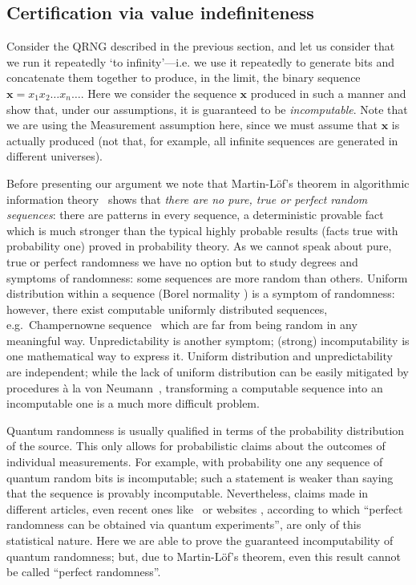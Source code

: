 \documentclass[%
 preprint,
 showpacs,
 showkeys,
 amsmath,
 amssymb,
 aps,
 pra,
 ]{revtex4-1}
\theoremstyle{definition}
\newcommand{\seq}[1]{\mathbf{#1}}
\begin{document}
\subsection{Certification via value indefiniteness}

Consider the QRNG
described in the previous section, and let us consider that we run it repeatedly `to infinity'---i.e. we use it repeatedly to generate bits and concatenate them together to produce, in the limit, the binary sequence $\seq{x}=x_1 x_2 \dots x_n \dots$.
Here we consider the sequence $\seq{x}$ produced in such a manner and show that, under our assumptions, it is guaranteed to be {\em incomputable}.
Note that we are using the Measurement assumption here, since we must assume that $\seq{x}$ is actually produced (not that, for example, all infinite sequences are generated in different universes).

Before presenting our argument we note that
Martin-L\"of's theorem in algorithmic information theory~\cite{calude:02}
shows that {\em there are no  pure, true or perfect random sequences}:
there are patterns in every sequence,
a deterministic provable fact which is much stronger than the typical
highly probable results (facts true with probability one) proved in probability theory.
As  we cannot speak about pure, true or perfect randomness
we have no option but to study degrees and symptoms of randomness:
some sequences are more random than others.
Uniform distribution within a sequence (Borel normality \cite{borel:09}) is a symptom of randomness:
however,  there exist
computable uniformly distributed sequences, e.g.\ Champernowne
 sequence~\cite{calude:02} which are far from being random in any meaningful way.
Unpredictability is another symptom;
(strong) incomputability is one mathematical way to express it.
Uniform distribution and unpredictability
are independent;
while the lack of uniform distribution can be easily mitigated by procedures
\`a la von Neumann~\cite{AbbottCalude10},
transforming a computable sequence  into an incomputable one is a much more difficult problem.

Quantum randomness is usually qualified in terms of the probability distribution of the source.
This only allows for probabilistic claims about the outcomes of individual measurements.
For example, with probability one any sequence of quantum random bits is incomputable; such a statement is
 weaker than saying that the sequence is  provably incomputable.
Nevertheless, claims made in different articles,
even recent ones like~\cite{10.1038/nature09008,Merali:2014aa}
or websites \cite{idQuantique,ANU}, according to which
``perfect randomness can be obtained via quantum experiments'',
are only of this statistical nature.
Here we are able to prove the guaranteed  incomputability of quantum randomness;
but, due to
Martin-L\"of's theorem, even this result cannot be called ``perfect randomness''.
\end{document}

